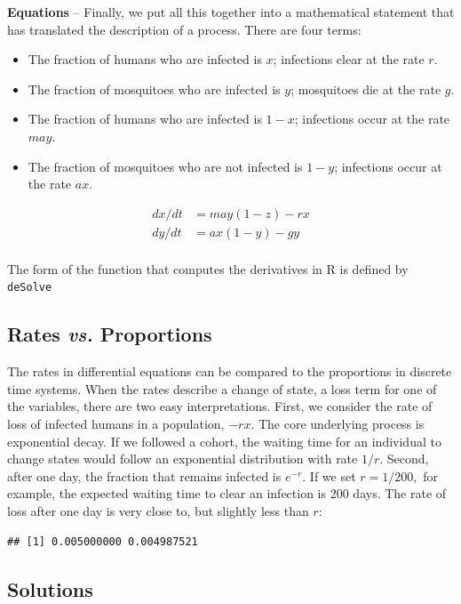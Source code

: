\documentclass[
]{book}
\begin{document}
\textbf{Equations} -- Finally, we put all this together into a mathematical statement that has translated the description of a process. There are four terms:

\begin{itemize}
\item
  The fraction of humans who are infected is \(x\); infections clear at the rate \(r.\)
\item
  The fraction of mosquitoes who are infected is \(y\); mosquitoes die at the rate \(g.\)
\item
  The fraction of humans who are infected is \(1-x\); infections occur at the rate \(m a y.\)
\item
  The fraction of mosquitoes who are not infected is \(1-y\); infections occur at the rate \(a x.\)
\end{itemize}

\[ 
\begin{array}{rl}
dx/dt &= may(1-z) - r x\\
dy/dt &= ax(1-y) - g y \\
\end{array}
\]

The form of the function that computes the derivatives in R is defined by \texttt{deSolve}

\subsection{\texorpdfstring{Rates \emph{vs.} Proportions}{Rates vs. Proportions}}\label{rates-vs.-proportions}

The rates in differential equations can be compared to the proportions in discrete time systems. When the rates describe a change of state, a loss term for one of the variables, there are two easy interpretations. First, we consider the rate of loss of infected humans in a population, \(-rx.\) The core underlying process is exponential decay. If we followed a cohort, the waiting time for an individual to change states would follow an exponential distribution with rate \(1/r\). Second, after one day, the fraction that remains infected is \(e^{-r}\). If we set \(r=1/200,\) for example, the expected waiting time to clear an infection is 200 days. The rate of loss after one day is very close to, but slightly less than \(r\):

\begin{verbatim}
## [1] 0.005000000 0.004987521
\end{verbatim}

\subsection{Solutions}\label{solutions}
\end{document}
